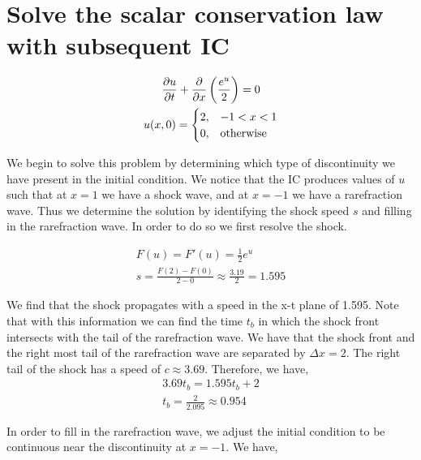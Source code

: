 \documentclass{article}
\begin{document}
\section{Solve the scalar conservation law with subsequent IC}
\begin{gather*}
    \frac{\partial u}{\partial t} + \frac{\partial }{\partial x}\left(\frac{e^u}{2}\right) = 0\\
    u(x,0) = \begin{cases}
        2, & -1 < x < 1\\
        0, & \text{otherwise}
        \end{cases}
\end{gather*}

We begin to solve this problem by determining which type of discontinuity we
have present in the initial condition. We notice that the IC produces values of
$u$ such that at $x = 1$ we have a shock wave, and at $x = -1$ we have a
rarefraction wave. Thus we determine the solution by identifying the shock speed
$s$ and filling in the rarefraction wave. In order to do so we first resolve the
shock. 

\begin{gather*}
    F(u) = F'(u) = \frac{1}{2}e^{u}\\
    s = \frac{F(2) - F(0)}{2 - 0} \approx \frac{3.19}{2} = 1.595
\end{gather*}

We find that the shock propagates with a speed in the x-t plane of 1.595. Note
that with this information we can find the time $t_b$ in which the shock front
intersects with the tail of the rarefraction wave. We have that the shock front
and the right most tail of the rarefraction wave are separated by $\Delta x =
2$. The right tail of the shock has a speed of $c \approx 3.69$. Therefore, we
have,
\begin{gather*}
    3.69t_b = 1.595t_b + 2\\
    t_b = \frac{2}{2.095} \approx 0.954
\end{gather*}

In order to fill in the rarefraction wave, we adjust the initial condition to be
continuous near the discontinuity at $x = -1$. We have,
\end{document}
